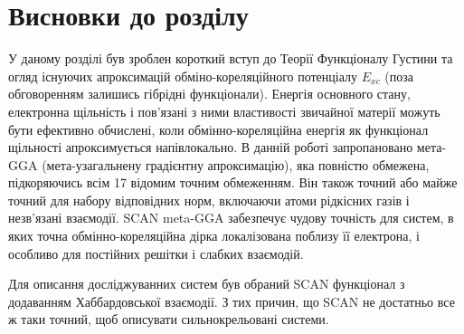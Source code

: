 \section{Висновки до розділу}
У даному розділі був зроблен короткий вступ до Теорії Функціоналу Густини та огляд існуючих апроксимацій обміно-кореляційного потенціалу $E_{xc}$ (поза обговоренням залишись гібрідні функціонали).
Енергія основного стану, електронна щільність і пов'язані з ними властивості звичайної матерії можуть бути ефективно обчислені, коли обмінно-кореляційна енергія як функціонал щільності апроксимується напівлокально. В данній роботі запропановано мета-GGA (мета-узагальнену градієнтну апроксимацію), яка повністю обмежена, підкоряючись всім 17 відомим точним обмеженням. Він також точний або майже точний для набору відповідних норм, включаючи атоми рідкісних газів і незв'язані взаємодії. SCAN meta-GGA забезпечує чудову точність для систем, в яких точна обмінно-кореляційна дірка локалізована поблизу її електрона, і особливо для постійних решітки і слабких взаємодій.

Для описання досліджуванних систем був обраний SCAN функціонал з додаванням Хаббардовської взаємодії. З тих причин, що SCAN не достатньо все ж таки точний, щоб описувати сильнокрельовані системи.




